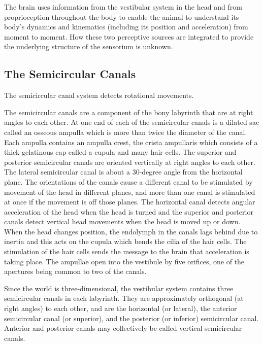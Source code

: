 \documentclass[]{book}
\begin{document}
The brain uses information from the vestibular system in the head and from proprioception throughout the body to enable the animal to understand its body's dynamics and kinematics (including its position and acceleration) from moment to moment. How these two perceptive sources are integrated to provide the underlying structure of the sensorium is unknown.

\hypertarget{the-semicircular-canals}{%
\subsection{The Semicircular Canals}\label{the-semicircular-canals}}

The semicircular canal system detects rotational movements.

The semicircular canals are a component of the bony labyrinth that are at right angles to each other. At one end of each of the semicircular canals is a dilated sac called an osseous ampulla which is more than twice the diameter of the canal. Each ampulla contains an ampulla crest, the crista ampullaris which consists of a thick gelatinous cap called a cupula and many hair cells. The superior and posterior semicircular canals are oriented vertically at right angles to each other. The lateral semicircular canal is about a 30-degree angle from the horizontal plane. The orientations of the canals cause a different canal to be stimulated by movement of the head in different planes, and more than one canal is stimulated at once if the movement is off those planes. The horizontal canal detects angular acceleration of the head when the head is turned and the superior and posterior canals detect vertical head movements when the head is moved up or down. When the head changes position, the endolymph in the canals lags behind due to inertia and this acts on the cupula which bends the cilia of the hair cells. The stimulation of the hair cells sends the message to the brain that acceleration is taking place. The ampullae open into the vestibule by five orifices, one of the apertures being common to two of the canals.

Since the world is three-dimensional, the vestibular system contains three semicircular canals in each labyrinth. They are approximately orthogonal (at right angles) to each other, and are the horizontal (or lateral), the anterior semicircular canal (or superior), and the posterior (or inferior) semicircular canal. Anterior and posterior canals may collectively be called vertical semicircular canals.
\end{document}
